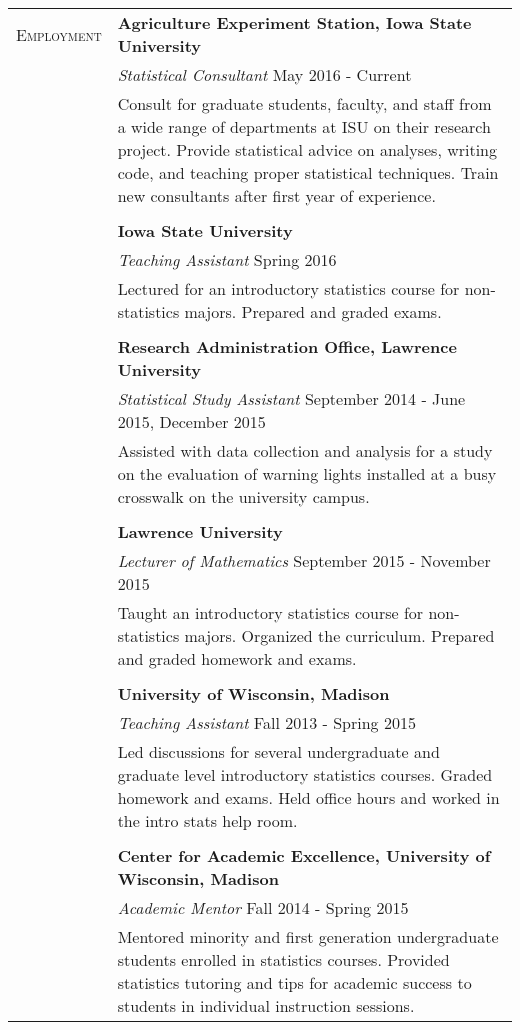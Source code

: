 \documentclass[11pt, oneside]{article}
\begin{document}
\noindent 
\begin{longtable}{p{3cm}p{14cm}}
\textsc{Employment} & \textbf{Agriculture Experiment Station, Iowa State University}\\
& \indent \emph{Statistical Consultant} \hfill{May 2016 - Current}\\
& \indent Consult for graduate students, faculty, and staff from a wide range of departments at ISU on their research project. Provide statistical advice on analyses, writing code, and teaching proper statistical techniques. Train new consultants after first year of experience.\\
\\
& \textbf{Iowa State University}\\
& \emph{Teaching Assistant} \hfill{Spring 2016}\\
& Lectured for an introductory statistics course for non-statistics majors. Prepared and graded exams.\\
\\
& \textbf{Research Administration Office, Lawrence University}\\
& \emph{Statistical Study Assistant} \hfill{September 2014 - June 2015, December 2015}\\
& Assisted with data collection and analysis for a study on the evaluation of warning lights installed at a busy crosswalk on the university campus.\\
\\
& \textbf{Lawrence University}\\
& \emph{Lecturer of Mathematics} \hfill{September 2015 - November 2015}\\
& Taught an introductory statistics course for non-statistics majors. Organized the curriculum. Prepared and graded homework and exams.\\
\\
& \textbf{University of Wisconsin, Madison}\\
& \emph{Teaching Assistant} \hfill{Fall 2013 - Spring 2015}\\
& Led discussions for several undergraduate and graduate level introductory statistics courses. Graded homework and exams. Held office hours and worked in the intro stats help room.\\
\\
& \textbf{Center for Academic Excellence, University of Wisconsin, Madison}\\
& \emph{Academic Mentor} \hfill{Fall 2014 - Spring 2015}\\
& Mentored minority and first generation undergraduate students enrolled in statistics courses. Provided statistics tutoring and tips for academic success to students in individual instruction sessions.
\end{longtable}
\end{document}
